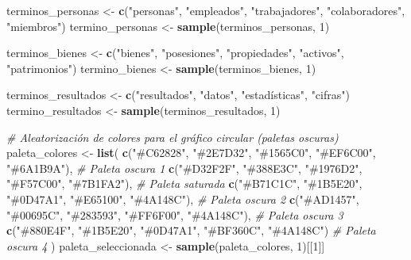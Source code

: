 \documentclass[
]{article}
\newenvironment{Shaded}{\begin{snugshade}}{\end{snugshade}}
\newcommand{\CommentTok}[1]{\textcolor[rgb]{0.56,0.35,0.01}{\textit{#1}}}
\newcommand{\DecValTok}[1]{\textcolor[rgb]{0.00,0.00,0.81}{#1}}
\newcommand{\FunctionTok}[1]{\textcolor[rgb]{0.13,0.29,0.53}{\textbf{#1}}}
\newcommand{\NormalTok}[1]{#1}
\newcommand{\OtherTok}[1]{\textcolor[rgb]{0.56,0.35,0.01}{#1}}
\newcommand{\StringTok}[1]{\textcolor[rgb]{0.31,0.60,0.02}{#1}}
\begin{document}
\begin{Shaded}
\begin{Highlighting}[]
\NormalTok{terminos\_personas }\OtherTok{\textless{}{-}} \FunctionTok{c}\NormalTok{(}\StringTok{"personas"}\NormalTok{, }\StringTok{"empleados"}\NormalTok{, }\StringTok{"trabajadores"}\NormalTok{, }\StringTok{"colaboradores"}\NormalTok{, }\StringTok{"miembros"}\NormalTok{)}
\NormalTok{termino\_personas }\OtherTok{\textless{}{-}} \FunctionTok{sample}\NormalTok{(terminos\_personas, }\DecValTok{1}\NormalTok{)}

\NormalTok{terminos\_bienes }\OtherTok{\textless{}{-}} \FunctionTok{c}\NormalTok{(}\StringTok{"bienes"}\NormalTok{, }\StringTok{"posesiones"}\NormalTok{, }\StringTok{"propiedades"}\NormalTok{, }\StringTok{"activos"}\NormalTok{, }\StringTok{"patrimonios"}\NormalTok{)}
\NormalTok{termino\_bienes }\OtherTok{\textless{}{-}} \FunctionTok{sample}\NormalTok{(terminos\_bienes, }\DecValTok{1}\NormalTok{)}

\NormalTok{terminos\_resultados }\OtherTok{\textless{}{-}} \FunctionTok{c}\NormalTok{(}\StringTok{"resultados"}\NormalTok{, }\StringTok{"datos"}\NormalTok{, }\StringTok{"estadísticas"}\NormalTok{, }\StringTok{"cifras"}\NormalTok{)}
\NormalTok{termino\_resultados }\OtherTok{\textless{}{-}} \FunctionTok{sample}\NormalTok{(terminos\_resultados, }\DecValTok{1}\NormalTok{)}

\CommentTok{\# Aleatorización de colores para el gráfico circular (paletas oscuras)}
\NormalTok{paleta\_colores }\OtherTok{\textless{}{-}} \FunctionTok{list}\NormalTok{(}
  \FunctionTok{c}\NormalTok{(}\StringTok{"\#C62828"}\NormalTok{, }\StringTok{"\#2E7D32"}\NormalTok{, }\StringTok{"\#1565C0"}\NormalTok{, }\StringTok{"\#EF6C00"}\NormalTok{, }\StringTok{"\#6A1B9A"}\NormalTok{),  }\CommentTok{\# Paleta oscura 1}
  \FunctionTok{c}\NormalTok{(}\StringTok{"\#D32F2F"}\NormalTok{, }\StringTok{"\#388E3C"}\NormalTok{, }\StringTok{"\#1976D2"}\NormalTok{, }\StringTok{"\#F57C00"}\NormalTok{, }\StringTok{"\#7B1FA2"}\NormalTok{),  }\CommentTok{\# Paleta saturada}
  \FunctionTok{c}\NormalTok{(}\StringTok{"\#B71C1C"}\NormalTok{, }\StringTok{"\#1B5E20"}\NormalTok{, }\StringTok{"\#0D47A1"}\NormalTok{, }\StringTok{"\#E65100"}\NormalTok{, }\StringTok{"\#4A148C"}\NormalTok{),  }\CommentTok{\# Paleta oscura 2}
  \FunctionTok{c}\NormalTok{(}\StringTok{"\#AD1457"}\NormalTok{, }\StringTok{"\#00695C"}\NormalTok{, }\StringTok{"\#283593"}\NormalTok{, }\StringTok{"\#FF6F00"}\NormalTok{, }\StringTok{"\#4A148C"}\NormalTok{),  }\CommentTok{\# Paleta oscura 3}
  \FunctionTok{c}\NormalTok{(}\StringTok{"\#880E4F"}\NormalTok{, }\StringTok{"\#1B5E20"}\NormalTok{, }\StringTok{"\#0D47A1"}\NormalTok{, }\StringTok{"\#BF360C"}\NormalTok{, }\StringTok{"\#4A148C"}\NormalTok{)   }\CommentTok{\# Paleta oscura 4}
\NormalTok{)}
\NormalTok{paleta\_seleccionada }\OtherTok{\textless{}{-}} \FunctionTok{sample}\NormalTok{(paleta\_colores, }\DecValTok{1}\NormalTok{)[[}\DecValTok{1}\NormalTok{]]}


\end{Highlighting}
\end{Shaded}
\end{document}
